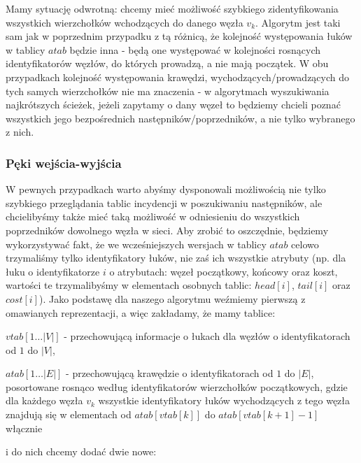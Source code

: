 Mamy sytuację odwrotną: chcemy mieć możliwość szybkiego zidentyfikowania wszystkich wierzchołków wchodzących do danego węzła $v_{k}$. Algorytm jest taki sam jak w poprzednim przypadku z tą różnicą, że kolejność występowania łuków w tablicy $atab$ będzie inna - będą one występować w kolejności rosnących identyfikatorów węzłów, do których prowadzą, a nie mają początek. W obu przypadkach kolejność występowania krawędzi, wychodzących/prowadzących do tych samych wierzchołków nie ma znaczenia - w algorytmach wyszukiwania najkrótszych ścieżek, jeżeli zapytamy o dany węzeł to będziemy chcieli poznać wszystkich jego bezpośrednich następników/poprzedników, a nie tylko wybranego z nich.

\subsubsection{Pęki wejścia-wyjścia}

W pewnych przypadkach warto abyśmy dysponowali możliwością nie tylko szybkiego przeglądania tablic incydencji w poszukiwaniu następników, ale chcielibyśmy także mieć taką możliwość w odniesieniu do wszystkich poprzedników dowolnego węzła w sieci. Aby zrobić to oszczędnie, będziemy wykorzystywać fakt, że we wcześniejszych wersjach w tablicy $atab$ celowo trzymaliśmy tylko identyfikatory łuków, nie zaś ich wszystkie atrybuty (np. dla łuku o identyfikatorze $i$ o atrybutach: węzeł początkowy, końcowy oraz koszt, wartości te trzymalibyśmy w elementach osobnych tablic: $head \left[ i \right] $,  $tail \left[ i \right] $ oraz  $cost \left[ i \right] $). Jako podstawę dla naszego algorytmu weźmiemy pierwszą z omawianych reprezentacji, a więc zakładamy, że mamy tablice:

\begin{myitemize}
	\item $ vtab \left[ 1 \ldots \left| V \right| \right] $ - przechowującą informacje o łukach dla węzłów o identyfikatorach od $1$ do $ \left| V \right| $,
	\item $atab \left[ 1 \ldots \left| E \right| \right] $ - przechowującą krawędzie o identyfikatorach od $1$ do $ \left| E \right| $, posortowane rosnąco według identyfikatorów wierzchołków początkowych, gdzie dla każdego węzła $v_{k}$ wszystkie identyfikatory łuków wychodzących z tego węzła znajdują się w elementach od $atab \left[ vtab \left[ k \right] \right] $ do $atab \left[ vtab \left[ k+1 \right] -1 \right] $ włącznie
\end{myitemize}

i do nich chcemy dodać dwie nowe:

